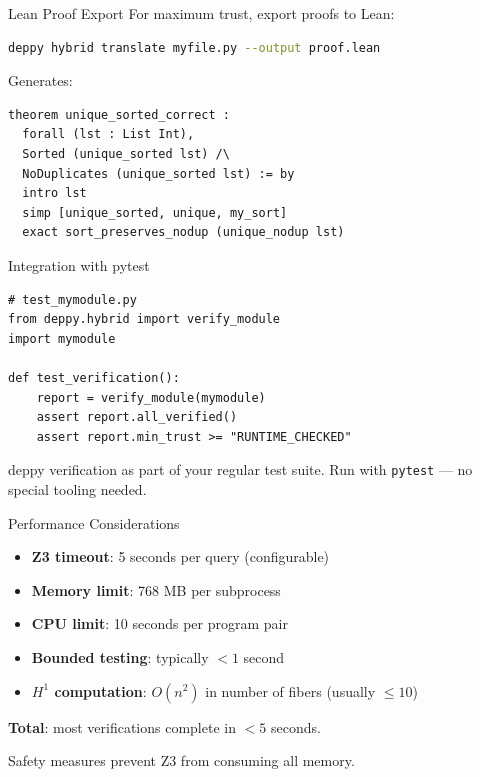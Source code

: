 \documentclass[aspectratio=169,11pt]{beamer}
\begin{document}
\begin{frame}{Lean Proof Export}
For maximum trust, export proofs to Lean:

\begin{lstlisting}[language=bash, basicstyle=\small\ttfamily]
deppy hybrid translate myfile.py --output proof.lean
\end{lstlisting}

\vspace{0.5em}
Generates:
\begin{lstlisting}[basicstyle=\small\ttfamily]
theorem unique_sorted_correct :
  forall (lst : List Int),
  Sorted (unique_sorted lst) /\
  NoDuplicates (unique_sorted lst) := by
  intro lst
  simp [unique_sorted, unique, my_sort]
  exact sort_preserves_nodup (unique_nodup lst)
\end{lstlisting}
\end{frame}

\begin{frame}{Integration with pytest}
\begin{lstlisting}[language=deppy, basicstyle=\small\ttfamily]
# test_mymodule.py
from deppy.hybrid import verify_module
import mymodule

def test_verification():
    report = verify_module(mymodule)
    assert report.all_verified()
    assert report.min_trust >= "RUNTIME_CHECKED"
\end{lstlisting}

\vspace{0.5em}
deppy verification as part of your regular test suite.
Run with \texttt{pytest} --- no special tooling needed.
\end{frame}

\begin{frame}{Performance Considerations}
\begin{itemize}
\item \textbf{Z3 timeout}: 5 seconds per query (configurable)
\item \textbf{Memory limit}: 768 MB per subprocess
\item \textbf{CPU limit}: 10 seconds per program pair
\item \textbf{Bounded testing}: typically $< 1$ second
\item \textbf{$H^1$ computation}: $O(n^2)$ in number of fibers (usually $\leq 10$)
\end{itemize}

\vspace{0.5em}
\textbf{Total}: most verifications complete in $< 5$ seconds.

\vspace{0.3em}
Safety measures prevent Z3 from consuming all memory.
\end{frame}
\end{document}
